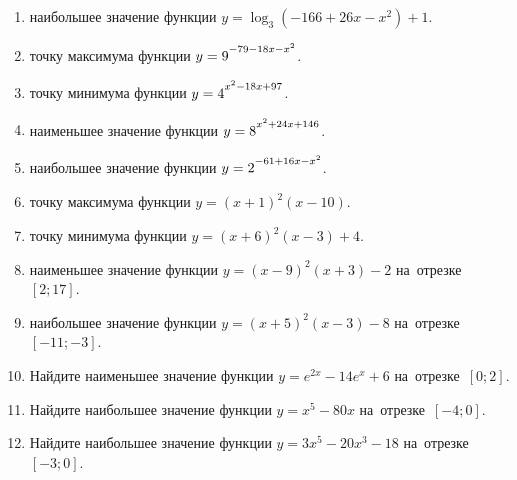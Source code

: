 \documentclass[a4paper,10pt]{article}
\begin{document}
\begin{enumerate}
\item {} наибольшее значение функции $y=\log_3\left(-166+26x-x^2\right)+1$.

\item {} точку максимума функции $y=9\strut^{-79-18x-x^2}$.

\item {} точку минимума функции $y=4\strut^{x^2-18x+97}$.

\item {} наименьшее значение функции $y=8\strut^{x^2+24x+146}$.

\item {} наибольшее значение функции $y=2\strut^{-61+16x-x^2}$.

\item {} точку максимума функции $y=\left(x+1\right)^2\left(x-10\right)$.

\item {} точку минимума функции $y=\left(x+6\right)^2\left(x-3\right)+4$.

\item {} наименьшее значение функции $y=\left(x-9\right)^2\left(x+3\right)-2$ на~отрезке~$\left[2;17\right]$.

\item {} наибольшее значение функции $y=\left(x+5\right)^2\left(x-3\right)-8$ на~отрезке~$\left[-11;-3\right]$.

\item Найдите наименьшее значение функции $y=e^{2x}-14e^x+6$ на~отрезке~$\left[0;2\right]$.

\item Найдите наибольшее значение функции $y=x^5-80x$ на~отрезке~$\left[-4;0\right]$.

\item Найдите наибольшее значение функции $y=3x^5-20x^3-18$ на~отрезке~$\left[-3;0\right]$.

\end{enumerate}
\end{document}
